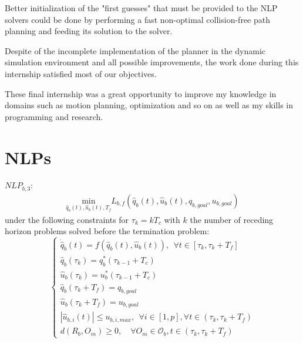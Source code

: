 \documentclass[12pt]{book}
\numberwithin{equation}{section}
\begin{document}
Better initialization of the "first guesses" that must be provided to the NLP solvers could be done by performing a fast non-optimal collision-free path planning and feeding its solution to the solver.

Despite of the incomplete implementation of the planner in the dynamic simulation environment and all possible improvements, the work done during this internship satisfied most of our objectives.

These final internship was a great opportunity to improve my knowledge in domains such as motion planning, optimization and so on as well as my skills in programming and research.





\appendix
\chapter{NLPs\label{app:nlps}}

$NLP_{b,3}$:
\begin{align}\label{eq:costsa}
\underset{\hat{q}_b(t),\hat{u}_b(t),T_f}{\mathrm{min}} L_{b,f}(\hat{q}_b(t), \hat{u}_b(t), q_{b,goal},u_{b,goal})
\end{align}
under the following constraints for $\tau_k = kT_c$ with $k$ the number of receding horizon
problems solved before the termination problem:
\begin{equation}\label{eq:constsa}
\left\lbrace\begin{array}{lcl}
    \dot{\hat{q}}_b(t) = f(\hat{q}_b(t),\hat{u}_b(t)),\ \ \forall t \in [\tau_{k}, \tau_{k}+T_f]\\
    \hat{q}_b(\tau_{k}) = q^*_{b}(\tau_{k-1}+T_c)\\
    \hat{u}_b(\tau_{k}) = u^*_{b}(\tau_{k-1}+T_c)\\
    \hat{q}_b(\tau_{k}+T_f) = q_{b,goal}\\
    \hat{u}_b(\tau_{k}+T_f) = u_{b,goal}\\
    |\hat{u}_{b,i}(t)| \leq u_{b,i,max},\ \ \forall i \in [1,p],\forall t \in (\tau_{k}, \tau_{k}+T_f)\\
    d(R_b, O_m) \geq 0,\quad \forall O_m \in \mathcal{O}_b, t \in (\tau_{k}, \tau_{k}+T_f)
\end{array}\right.
\end{equation}
\end{document}
